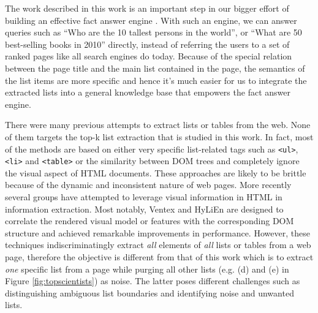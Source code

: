 
The work described in this work is an important step in our bigger effort of
building an effective fact answer engine \cite{YinTL11:Facto}. 
With such an engine, we can answer queries such as
``Who are the 10 tallest persons in the world'', or ``What are 50 best-selling
books in 2010'' directly, instead of referring the users to a set of ranked
pages like all search engines do today. Because of the special relation
between the page title and the main list contained in the page, the semantics
of the list items are more specific and hence it's much easier for us to
integrate the extracted lists into a general knowledge base that empowers
the fact answer engine. 


There were many previous attempts to extract lists or tables from the web.
None of them targets the top-k list extraction that is studied in
this work. In fact, most of the methods are based on either very specific
list-related tags \cite{googlesets,webtables08} 
such as {\tt <ul>}, {\tt <li>} and {\tt <table>} 
or the similarity between DOM trees 
\cite{LiuGZ03:MDR,MiaoTHSM09:TagPathClustering} and completely ignore
the visual aspect of HTML documents. These approaches are likely to be
brittle because of the dynamic and inconsistent nature of web
pages. More recently several groups
have attempted to leverage visual information in HTML in 
information extraction. Most notably, Ventex 
\cite{GatterbauerBHKP2007:Towards} and HyLiEn \cite{FumarolaWBMH11:List} 
are designed to correlate the rendered visual model or features
with the corresponding DOM structure and achieved remarkable improvements
in performance. However, these techniques indiscriminatingly extract {\em all}
elements of {\em all} lists or tables from a web page, therefore the objective
is different from that of this work which is to extract {\em one} specific
list from a page while purging all other lists (e.g. (d) and (e) in
Figure \ref{fig:topscientists}) as noise. The latter poses
different challenges such as distinguishing ambiguous list boundaries
and identifying noise and unwanted lists. 

